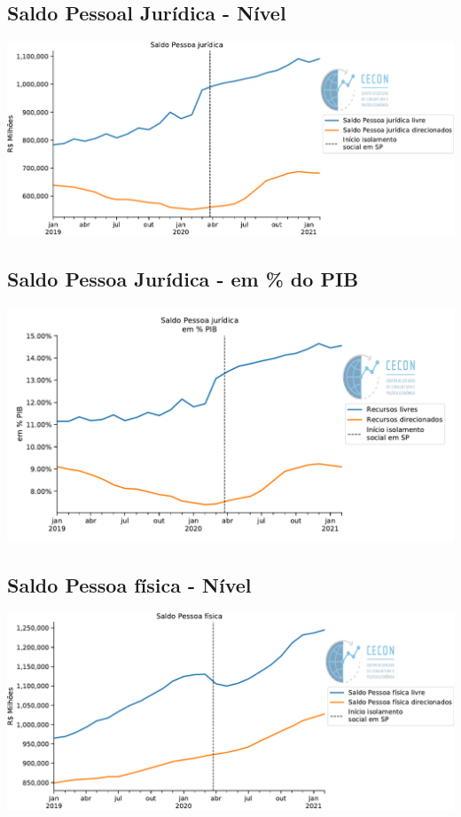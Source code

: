 \documentclass{SelfArx}
\begin{document}
\subsection*{Saldo Pessoal Jurídica - Nível}
\label{sec:org5be84f6}

\begin{center}
\includegraphics[width=.9\linewidth]{./figs/Credito/SaldoPJ.pdf}
\end{center}



\subsection*{Saldo Pessoa Jurídica - em \% do PIB}
\label{sec:org5a02084}
\begin{center}
\includegraphics[width=.9\linewidth]{./figs/Credito/SaldoPJ_PIB.pdf}
\end{center}

\subsection*{Saldo Pessoa física - Nível}
\label{sec:org2d74eb7}

\begin{center}
\includegraphics[width=.9\linewidth]{./figs/Credito/SaldoPF.pdf}
\end{center}
\end{document}
